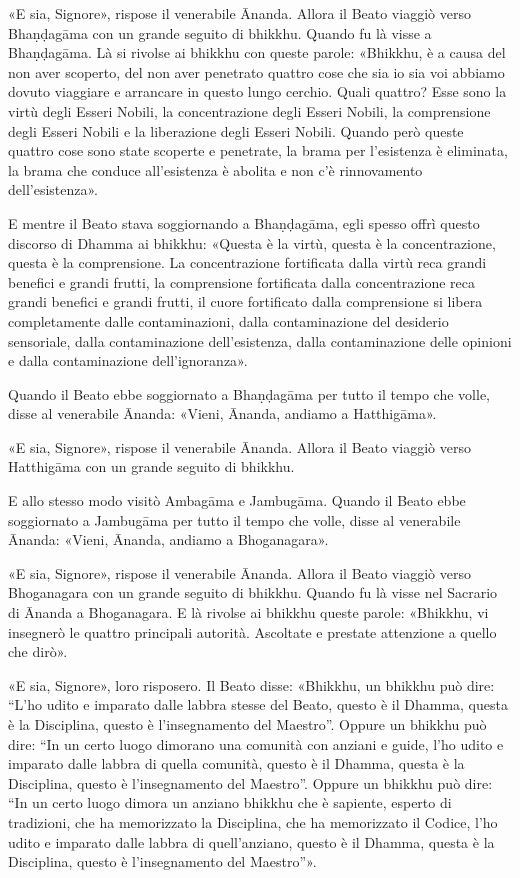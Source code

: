 «E sia, Signore», rispose il venerabile Ānanda. Allora il Beato viaggiò verso
Bhaṇḍagāma con un grande seguito di bhikkhu. Quando fu là visse a Bhaṇḍagāma. Là
si rivolse ai bhikkhu con queste parole: «Bhikkhu, è a causa del non aver
scoperto, del non aver penetrato quattro cose che sia io sia voi abbiamo dovuto
viaggiare e arrancare in questo lungo cerchio. Quali quattro? Esse sono la virtù
degli Esseri Nobili, la concentrazione degli Esseri Nobili, la comprensione
degli Esseri Nobili e la liberazione degli Esseri Nobili. Quando però queste
quattro cose sono state scoperte e penetrate, la brama per l’esistenza è
eliminata, la brama che conduce all’esistenza è abolita e non c’è rinnovamento
dell’esistenza».


E mentre il Beato stava soggiornando a Bhaṇḍagāma, egli spesso offrì questo
discorso di Dhamma ai bhikkhu: «Questa è la virtù, questa è la concentrazione,
questa è la comprensione. La concentrazione fortificata dalla virtù reca grandi
benefici e grandi frutti, la comprensione fortificata dalla concentrazione reca
grandi benefici e grandi frutti, il cuore fortificato dalla comprensione si
libera completamente dalle contaminazioni, dalla contaminazione del desiderio
sensoriale, dalla contaminazione dell’esistenza, dalla contaminazione delle
opinioni e dalla contaminazione dell’ignoranza».

Quando il Beato ebbe soggiornato a Bhaṇḍagāma per tutto il tempo che volle,
disse al venerabile Ānanda: «Vieni, Ānanda, andiamo a Hatthigāma».

«E sia, Signore», rispose il venerabile Ānanda. Allora il Beato viaggiò verso
Hatthigāma con un grande seguito di bhikkhu.

E allo stesso modo visitò Ambagāma e Jambugāma. Quando il Beato ebbe soggiornato
a Jambugāma per tutto il tempo che volle, disse al venerabile Ānanda: «Vieni,
Ānanda, andiamo a Bhoganagara».

«E sia, Signore», rispose il venerabile Ānanda. Allora il Beato viaggiò verso
Bhoganagara con un grande seguito di bhikkhu. Quando fu là visse nel Sacrario di
Ānanda a Bhoganagara. E là rivolse ai bhikkhu queste parole: «Bhikkhu, vi
insegnerò le quattro principali autorità. Ascoltate e prestate attenzione a
quello che dirò».

«E sia, Signore», loro risposero. Il Beato disse: «Bhikkhu, un bhikkhu può dire:
“L’ho udito e imparato dalle labbra stesse del Beato, questo è il Dhamma, questa
è la Disciplina, questo è l’insegnamento del Maestro”. Oppure un bhikkhu può
dire: “In un certo luogo dimorano una comunità con anziani e guide, l’ho udito e
imparato dalle labbra di quella comunità, questo è il Dhamma, questa è la
Disciplina, questo è l’insegnamento del Maestro”. Oppure un bhikkhu può dire:
“In un certo luogo dimora un anziano bhikkhu che è sapiente, esperto di
tradizioni, che ha memorizzato la Disciplina, che ha memorizzato il Codice, l’ho
udito e imparato dalle labbra di quell’anziano, questo è il Dhamma, questa è la
Disciplina, questo è l’insegnamento del Maestro”».

